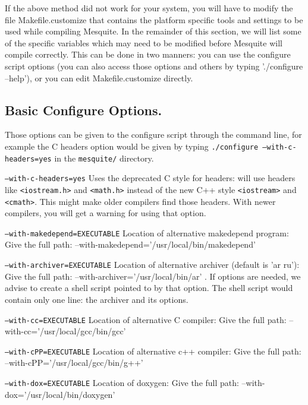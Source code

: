 \documentclass[letter]{report}
\begin{document}
If the above method did not work for your system, you will have to modify the file
Makefile.customize that contains the platform specific tools and settings to be used 
while compiling Mesquite. In the remainder of this section, we
will  list some of the specific variables which
may need to be modified before Mesquite will compile correctly.
This can be done in two manners: you can use the configure
script options (you can also access those options and
others by typing './configure --help'), or you can edit
Makefile.customize directly.

\subsection{Basic Configure Options.}  \label{config_options}

Those options can be given to the configure script through the command line, for example the C headers
option would be given by typing \texttt{./configure --with-c-headers=yes} in the \texttt{mesquite/} directory.

\begin{description}
\item \texttt{--with-c-headers=yes} Uses the deprecated C style for headers:
  will use headers like \texttt{<iostream.h>} and \texttt{<math.h>}
  instead of the new C++ style \texttt{<iostream>} and \texttt{<cmath>}. This might make older
  compilers find those headers. With newer compilers, you will get a warning for using that option.
\item \texttt{--with-makedepend=EXECUTABLE} Location of alternative makedepend program:
Give the full path:  --with-makedepend='/usr/local/bin/makedepend'
\item \texttt{--with-archiver=EXECUTABLE} Location of alternative archiver (default is 'ar ru'):
Give the full path: --with-archiver='/usr/local/bin/ar' . If options are needed, we advise to
create a shell script pointed to by that option. The shell script would contain only one line: the
archiver and its options. 
\item \texttt{--with-cc=EXECUTABLE} Location of alternative C compiler:
Give the full path: --with-cc='/usr/local/gcc/bin/gcc'
\item \texttt{--with-cPP=EXECUTABLE} Location of alternative c++ compiler:
Give the full path:  --with-cPP='/usr/local/gcc/bin/g++'
\item \texttt{--with-dox=EXECUTABLE} Location of doxygen:
Give the full path: --with-dox='/usr/local/bin/doxygen'
\end{description}
\end{document}
